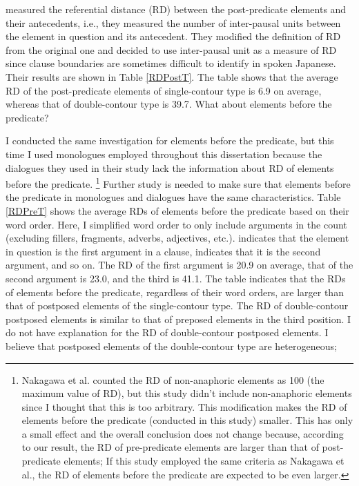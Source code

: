  measured the referential distance (RD) between the post-predicate elements and their antecedents,
i.e., they measured the number of inter-pausal units between the element in question and its antecedent.
They modified the definition of RD from the original one \cite{givon83} and decided to use inter-pausal unit as a measure of RD
since clause boundaries are sometimes difficult to identify in spoken Japanese.
Their results are shown in Table \ref{RDPostT}.
The table shows that the average RD of the post-predicate elements of single-contour type is 6.9 on average,
whereas that of double-contour type is 39.7.
What about elements before the predicate?

I conducted the same investigation for elements before the predicate, but this time I used monologues employed throughout this dissertation
because the dialogues they used in their study lack the information about RD of elements before the predicate.%
	\footnote{
	Nakagawa et al. counted the RD of non-anaphoric elements as 100 (the maximum value of RD),
	but this study didn't include non-anaphoric elements
	since I thought that this is too arbitrary.
	This modification makes the RD of elements before the predicate (conducted in this study) smaller.
	This has only a small effect and the overall conclusion does not change because,
	according to our result,
	the RD of pre-predicate elements are larger than that of post-predicate elements;
	If this study employed the same criteria as Nakagawa et al.,
	the RD of elements before the predicate are expected to be even larger.
	}
Further study is needed to make sure that elements before the predicate in monologues and dialogues have the same characteristics.
Table \ref{RDPreT} shows the average RDs of elements before the predicate based on their word order.
Here, I simplified word order to only include arguments in the count (excluding fillers, fragments, adverbs, adjectives, etc.).
 indicates that the element in question is the first argument in a clause,
 indicates that it is the second argument, and so on.
The RD of the first argument is 20.9 on average,
that of the second argument is 23.0, and
the third is 41.1.
The table indicates that the RDs of elements before the predicate,
regardless of their word orders,
are larger than that of postposed elements of the single-contour type.
The RD of double-contour postposed elements is similar to that of preposed elements in the third position.
I do not have explanation for the RD of double-contour postposed elements.
I believe that postposed elements of the double-contour type are heterogeneous;
